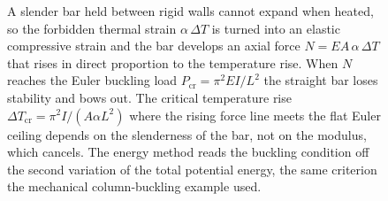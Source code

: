 \begin{figure}[htbp]
\caption[Thermal buckling of a restrained bar]{A slender bar held between rigid
walls cannot expand when heated, so the forbidden thermal strain
$\alpha\,\Delta T$ is turned into an elastic compressive strain and the bar
develops an axial force $N=EA\,\alpha\,\Delta T$ that rises in direct
proportion to the temperature rise. When $N$ reaches the Euler buckling load
$P_\mathrm{cr}=\pi^2EI/L^2$ the straight bar loses stability and bows out. The
critical temperature rise $\Delta T_\mathrm{cr}=\pi^2 I/(A\alpha L^2)$ where the
rising force line meets the flat Euler ceiling depends on the slenderness of
the bar, not on the modulus, which cancels. The energy method reads the
buckling condition off the second variation of the total potential energy, the
same criterion the mechanical column-buckling example used.}
\label{fig:vol03ch05:thermal-buckling}
\end{figure}

